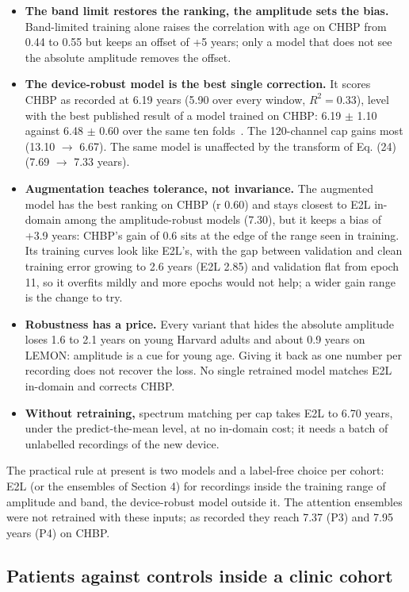 \documentclass[11pt,a4paper]{article}
\begin{document}
\begin{itemize}
\item \textbf{The band limit restores the ranking, the amplitude sets the bias.} Band-limited training alone raises the correlation with age on CHBP from 0.44 to 0.55 but keeps an offset of +5 years; only a model that does not see the absolute amplitude removes the offset.
\item \textbf{The device-robust model is the best single correction.} It scores CHBP as recorded at 6.19 years (5.90 over every window, $R^2 = 0.33$), level with the best published result of a model trained on CHBP: 6.19 $\pm$ 1.10 against 6.48 $\pm$ 0.60 over the same ten folds~\citep{engemann2022benchmark}. The 120-channel cap gains most (13.10 $\rightarrow$ 6.67). The same model is unaffected by the transform of Eq. (24) (7.69 $\rightarrow$ 7.33 years).
\item \textbf{Augmentation teaches tolerance, not invariance.} The augmented model has the best ranking on CHBP (r 0.60) and stays closest to E2L in-domain among the amplitude-robust models (7.30), but it keeps a bias of +3.9 years: CHBP's gain of 0.6 sits at the edge of the range seen in training. Its training curves look like E2L's, with the gap between validation and clean training error growing to 2.6 years (E2L 2.85) and validation flat from epoch 11, so it overfits mildly and more epochs would not help; a wider gain range is the change to try.
\item \textbf{Robustness has a price.} Every variant that hides the absolute amplitude loses 1.6 to 2.1 years on young Harvard adults and about 0.9 years on LEMON: amplitude is a cue for young age. Giving it back as one number per recording does not recover the loss. No single retrained model matches E2L in-domain and corrects CHBP.
\item \textbf{Without retraining,} spectrum matching per cap takes E2L to 6.70 years, under the predict-the-mean level, at no in-domain cost; it needs a batch of unlabelled recordings of the new device.
\end{itemize}

The practical rule at present is two models and a label-free choice per cohort: E2L (or the ensembles of Section 4) for recordings inside the training range of amplitude and band, the device-robust model outside it. The attention ensembles were not retrained with these inputs; as recorded they reach 7.37 (P3) and 7.95 years (P4) on CHBP.

\subsection{Patients against controls inside a clinic cohort}
\end{document}
